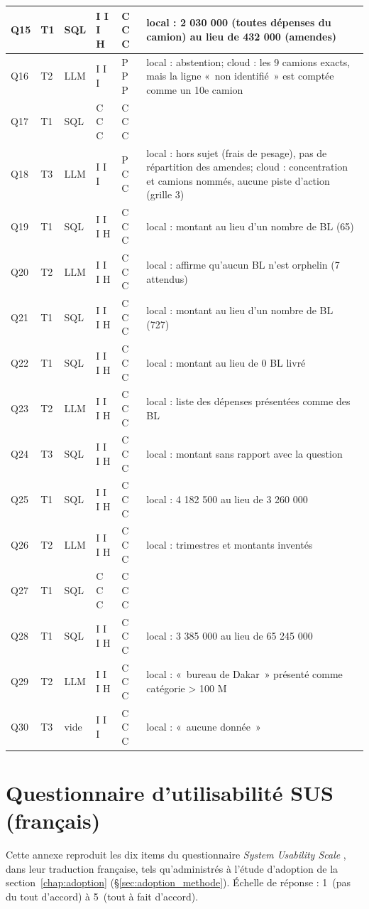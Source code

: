 {\begin{longtable}{|p{0.7cm}|p{0.6cm}|p{0.8cm}|p{1.3cm}|p{1.3cm}|>{\raggedright\arraybackslash}p{8.0cm}|}
Q15 & T1 & SQL & I I I H & C C C  & local : 2 030 000 (toutes dépenses du camion) au lieu de 432 000 (amendes) \\ \hline
Q16 & T2 & LLM & I I I  & P P P  & local : abstention; cloud : les 9 camions exacts, mais la ligne «~non identifié~» est comptée comme un 10e camion \\ \hline
Q17 & T1 & SQL & C C C  & C C C  &  \\ \hline
Q18 & T3 & LLM & I I I  & P C C  & local : hors sujet (frais de pesage), pas de répartition des amendes; cloud : concentration et camions nommés, aucune piste d'action (grille 3) \\ \hline
Q19 & T1 & SQL & I I I H & C C C  & local : montant au lieu d'un nombre de BL (65) \\ \hline
Q20 & T2 & LLM & I I I H & C C C  & local : affirme qu'aucun BL n'est orphelin (7 attendus) \\ \hline
Q21 & T1 & SQL & I I I H & C C C  & local : montant au lieu d'un nombre de BL (727) \\ \hline
Q22 & T1 & SQL & I I I H & C C C  & local : montant au lieu de 0 BL livré \\ \hline
Q23 & T2 & LLM & I I I H & C C C  & local : liste des dépenses présentées comme des BL \\ \hline
Q24 & T3 & SQL & I I I H & C C C  & local : montant sans rapport avec la question \\ \hline
Q25 & T1 & SQL & I I I H & C C C  & local : 4 182 500 au lieu de 3 260 000 \\ \hline
Q26 & T2 & LLM & I I I H & C C C  & local : trimestres et montants inventés \\ \hline
Q27 & T1 & SQL & C C C  & C C C  &  \\ \hline
Q28 & T1 & SQL & I I I H & C C C  & local : 3 385 000 au lieu de 65 245 000 \\ \hline
Q29 & T2 & LLM & I I I H & C C C  & local : «~bureau de Dakar~» présenté comme catégorie > 100 M \\ \hline
Q30 & T3 & vide & I I I  & C C C  & local : «~aucune donnée~» \\ \hline
\end{longtable}
}

\chapter{Questionnaire d'utilisabilité SUS (français)}
\label{annexe:sus}

Cette annexe reproduit les dix items du questionnaire \textit{System Usability Scale} \cite{brookeSUSAQuickDirty1996}, dans leur traduction française, tels qu'administrés à l'étude d'adoption de la section~\ref{chap:adoption} (§\ref{sec:adoption_methode}). Échelle de réponse : 1~(pas du tout d'accord) à 5~(tout à fait d'accord).

